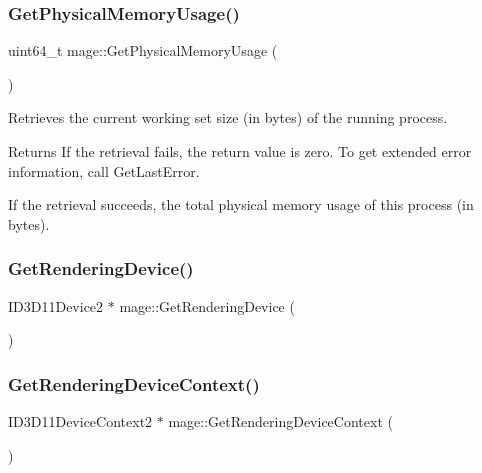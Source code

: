 \subsubsection{\texorpdfstring{Get\+Physical\+Memory\+Usage()}{GetPhysicalMemoryUsage()}}
{\footnotesize\ttfamily uint64\+\_\+t mage\+::\+Get\+Physical\+Memory\+Usage (\begin{DoxyParamCaption}{ }\end{DoxyParamCaption})}

Retrieves the current working set size (in bytes) of the running process.

\begin{DoxyReturn}{Returns}
If the retrieval fails, the return value is zero. To get extended error information, call Get\+Last\+Error. 

If the retrieval succeeds, the total physical memory usage of this process (in bytes). 
\end{DoxyReturn}
\hypertarget{namespacemage_a30c7feb10b2be75bbce6d9c3739899c6}{}\label{namespacemage_a30c7feb10b2be75bbce6d9c3739899c6} 
\subsubsection{\texorpdfstring{Get\+Rendering\+Device()}{GetRenderingDevice()}}
{\footnotesize\ttfamily I\+D3\+D11\+Device2 $\ast$ mage\+::\+Get\+Rendering\+Device (\begin{DoxyParamCaption}{ }\end{DoxyParamCaption})}

\hypertarget{namespacemage_a55d3eaa7476e19ec8969e27d69249d95}{}\label{namespacemage_a55d3eaa7476e19ec8969e27d69249d95} 
\subsubsection{\texorpdfstring{Get\+Rendering\+Device\+Context()}{GetRenderingDeviceContext()}}
{\footnotesize\ttfamily I\+D3\+D11\+Device\+Context2 $\ast$ mage\+::\+Get\+Rendering\+Device\+Context (\begin{DoxyParamCaption}{ }\end{DoxyParamCaption})}

\hypertarget{namespacemage_a36a7338e52586e714ef646dea200a115}{}\label{namespacemage_a36a7338e52586e714ef646dea200a115} 
